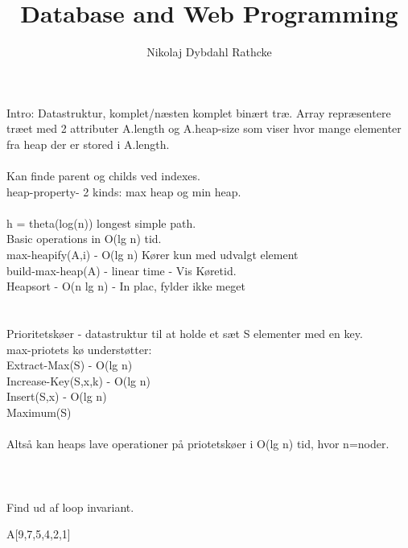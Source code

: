 \documentclass[12pt]{article}
\title{Database and Web Programming}
\author{Nikolaj Dybdahl Rathcke}
\begin{document}
Intro: Datastruktur, komplet/næsten komplet binært træ. Array repræsentere træet med 2 attributer A.length og A.heap-size som viser hvor mange elementer fra heap der er stored i A.length.\\
\\
Kan finde parent og childs ved indexes.
\\
heap-property- 2 kinds: max heap og min heap.\\
\\
h = theta(log(n)) longest simple path.
\\
Basic operations in O(lg n) tid.
\\
max-heapify(A,i) - O(lg n) Kører kun med udvalgt element\\
build-max-heap(A) - linear time - Vis Køretid.\\
Heapsort - O(n lg n) - In plac, fylder ikke meget\\
\\\\
Prioritetskøer - datastruktur til at holde et sæt S elementer med en key.\\
max-priotets kø understøtter:\\
Extract-Max(S) - O(lg n)\\
Increase-Key(S,x,k) - O(lg n)\\
Insert(S,x) - O(lg n)\\
Maximum(S)\\
\\
Altså kan heaps lave operationer på priotetskøer i O(lg n) tid, hvor n=noder.\\
\\
\\
\\
Find ud af loop invariant.

A[9,7,5,4,2,1]
\end{document}
